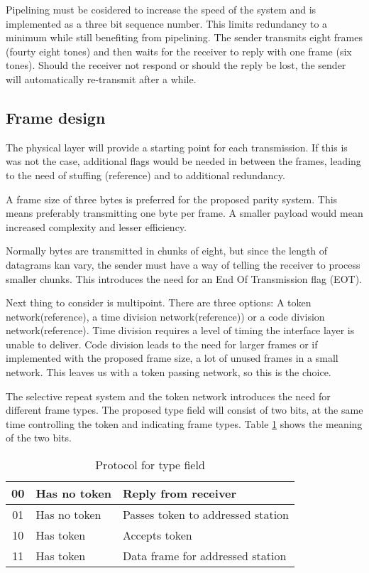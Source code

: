 Pipelining must be cosidered to increase the speed of the system and is
implemented as a three bit sequence number. This limits redundancy to a minimum
while still benefiting from pipelining. The sender transmits eight frames
(fourty eight tones) and then waits for the receiver to reply with one frame
(six tones). Should the receiver not respond or should the reply be lost, the
sender will automatically re-transmit after a while.

\subsection{Frame design}
The physical layer will provide a starting point for each
transmission. If this is was not the case,
additional flags would be needed in between the frames, leading to the
need of stuffing (reference) and to additional redundancy.

A frame size of three bytes is preferred for the proposed parity system. This
means preferably transmitting one byte per frame. A smaller payload would mean
increased complexity and lesser efficiency.

Normally bytes are transmitted in chunks of eight, but since the length of
datagrams kan vary, the sender must have a way of telling the receiver to process smaller
chunks. This introduces the need for an End Of Transmission flag (EOT).

Next thing to consider is multipoint. There are three options: A token
network(reference), a time division network(reference)) or a code division
network(reference). Time division requires a level of timing the interface layer
is unable to deliver. Code division leads to the need for larger frames or if implemented with the
proposed frame size, a lot of unused frames in a small network. This leaves us
with a token passing network, so this is the choice.

The selective repeat system and the token network introduces the need for
different frame types. The proposed type field will consist of two bits, at the
same time controlling the token and indicating frame types. Table
\ref{tab:protocol_for_type_field} shows the meaning of the two bits.

\begin{table}[htb]
	\begin{center}
	\begin{tabular}{|c|ll|}
		\hline
		00 & Has no token & Reply from receiver \\
		\hline
		01 & Has no token & Passes token to addressed station \\
		\hline
		10 & Has token & Accepts token \\
		\hline
		11 & Has token & Data frame for addressed station \\
		\hline
	\end{tabular}
	\end{center}
	\caption{Protocol for type field}
	\label{tab:protocol_for_type_field}
\end{table}

